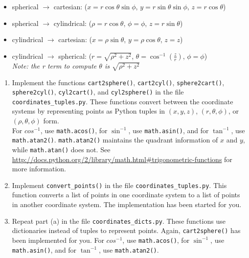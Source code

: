 \documentclass{article}
\newcounter{points}
\begin{document}
\begin{enumerate}
\begin{itemize}
\item{spherical $\rightarrow$ cartesian: ($x = r\cos\theta\sin\phi$, $y = r\sin\theta\sin\phi$, $z = r\cos\theta$)}
\item{spherical $\rightarrow$ cylindrical: ($\rho = r\cos\theta$, $\phi = \phi$, $z = r\sin\theta$)}

\item{cylindrical $\rightarrow$ cartesian: ($x = \rho\sin\theta$, $y = \rho\cos\theta$, $z = z$)}
\item{cylindrical $\rightarrow$ spherical: ($r = \sqrt{\rho^2 + z^2}$, $\theta = \cos^{-1}\left(\frac{z}{r}\right)$, $\phi = \phi$)  \\
\emph{Note: the r term to compute $\theta$ is $\sqrt{\rho^2 + z^2}$}
}
\end{itemize}

\begin{enumerate}
\item Implement the functions \texttt{cart2sphere()}, \texttt{cart2cyl()}, \texttt{sphere2cart()}, \texttt{sphere2cyl()}, \texttt{cyl2cart()}, and \texttt{cyl2sphere()} in the file \texttt{coordinates\_tuples.py}.  These functions convert between the coordinate systems by representing points as Python tuples in $(x, y, z)$, $(r, \theta, \phi)$, or $(\rho, \theta, \phi)$ form. \\

For $cos^{-1}$, use \texttt{math.acos()}, for $\sin^{-1}$, use \texttt{math.asin()}, and for $\tan^{-1}$, use \texttt{math.atan2()}.  \texttt{math.atan2()} maintains the quadrant information of $x$ and $y$, while \texttt{math.atan()} does not.  See \url{http://docs.python.org/2/library/math.html#trigonometric-functions} for more information.
\end{enumerate}

\begin{enumerate}
\setcounter{enumii}{1}
\item Implement \texttt{convert\_points()} in the file \texttt{coordinates\_tuples.py}.  This function converts a list of points in one coordinate system to a list of points in another coordinate system.  The implementation has been started for you.
\end{enumerate}

\begin{enumerate}
\setcounter{enumii}{2}
\item Repeat part (a) in the file \texttt{coordinates\_dicts.py}.  These functions use dictionaries instead of tuples to represent points.  Again, \texttt{cart2sphere()} has been implemented for you.  For $cos^{-1}$, use \texttt{math.acos()}, for $\sin^{-1}$, use \texttt{math.asin()}, and for $\tan^{-1}$, use \texttt{math.atan2()}.
\end{enumerate}


\end{enumerate}
\end{document}
